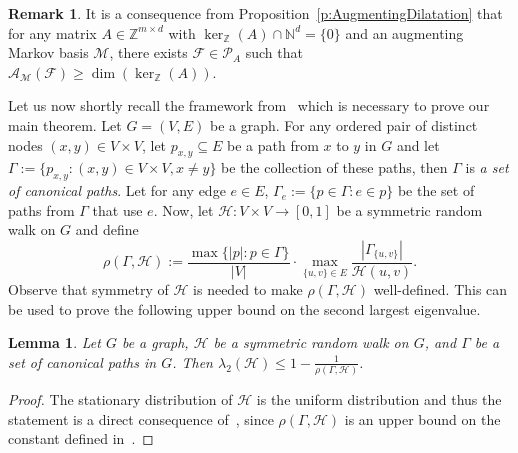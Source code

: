 \documentclass[11pt]{amsart}
\newtheorem{lemma}[thm]{Lemma}
\theoremstyle{definition}
\newtheorem{remark}[thm]{Remark}
\numberwithin{equation}{section}
\newcommand{\ring}[1]{\ensuremath{\mathbb{#1}}}
\renewcommand{\>}{\rangle}
\newcommand{\<}{\langle}
\newcommand{\0}{\mathbf{0}}
\newcommand{\1}{\mathbf{1}}
\newcommand{\2}{\mathbf{2}}
\newcommand\NN{\ring{N}}
\newcommand\ZZ{\ring{Z}}
\newcommand\cA{{\mathcal A}}
\newcommand\cF{{\mathcal F}}
\newcommand\cH{{\mathcal H}}
\newcommand\cM{{\mathcal M}}
\newcommand\cP{{\mathcal P}}
\newcommand{\auglen}[2]{\cA_{#1}(#2)}
\begin{document}
\begin{remark}
It is a consequence from Proposition~\ref{p:AugmentingDilatation}
that for any matrix $A\in\ZZ^{m\times d}$ with
$\ker_\ZZ(A)\cap\NN^d=\{0\}$ and an augmenting Markov
basis $\cM$, there exists $\cF\in\cP_A$ such that
$\auglen{\cM}{\cF}\ge\dim(\ker_\ZZ(A))$.
\end{remark}

Let us now shortly recall the framework from~\cite{Sinclair1992} which
is necessary to prove our main theorem. Let $G=(V,E)$ be a graph. For
any ordered pair of distinct nodes $(x,y)\in V\times V$, let
$p_{x,y}\subseteq E$ be a path from $x$ to $y$ in $G$ and let
$\Gamma:=\{p_{x,y}: (x,y)\in V\times V, x\neq y\}$ be the collection
of these paths, then $\Gamma$ is \emph{a set of canonical paths}.
Let for any edge $e\in E$, $\Gamma_e:=\{p\in\Gamma: e\in p\}$ be the
set of paths from $\Gamma$ that use $e$. Now, let $\cH:V\times V\to[0,1]$ be a symmetric
random walk on $G$ and define
\begin{equation*}
\rho(\Gamma,\cH):=\frac{\max\{|p|:
p\in\Gamma\}}{|V|}\cdot\max_{\{u,v\}\in
E}\frac{|\Gamma_{\{u,v\}}|}{\cH(u,v)}.
\end{equation*}
Observe that symmetry of $\cH$ is needed to make $\rho(\Gamma,\cH)$
well-defined. This can be used to prove the following upper bound on
the second largest eigenvalue.

\begin{lemma}\label{l:CanonicalPaths}
Let $G$ be a graph, $\cH$ be a symmetric random walk on $G$, and
$\Gamma$ be a set of canonical paths in $G$. Then
$\lambda_2(\cH)\le 1-\frac{1}{\rho(\Gamma,\cH)}$.
\end{lemma}
\begin{proof}
The stationary distribution of $\cH$ is the uniform distribution and
thus the statement is a direct consequence of~\cite[Theorem~5]{Sinclair1992},
since $\rho(\Gamma,\cH)$ is an upper bound on the constant defined
in~\cite[equation~4]{Sinclair1992}.
\end{proof}
\end{document}
